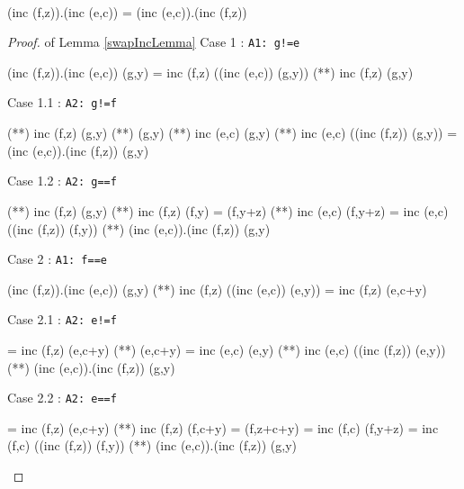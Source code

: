 \begin{lemma}\label{swapIncLemma}\ 
\begin{code}
(inc (f,z)).(inc (e,c)) = (inc (e,c)).(inc (f,z))
\end{code}
\end{lemma}
\begin{proof} of Lemma \ref{swapIncLemma}
Case 1 : \verb|A1: g!=e|
\begin{code}
(inc (f,z)).(inc (e,c)) (g,y) = inc (f,z) ((inc (e,c)) (g,y))
                              (**) inc (f,z) (g,y)
\end{code}
Case 1.1 : \verb|A2: g!=f|
\begin{code}
                              (**) inc (f,z) (g,y)
                              (**) (g,y)
                              (**) inc (e,c) (g,y)
                              (*\sEq{A2}*) inc (e,c) ((inc (f,z)) (g,y))
                              = (inc (e,c)).(inc (f,z)) (g,y)
\end{code}
Case 1.2 : \verb|A2: g==f|
\begin{code}
                              (**) inc (f,z) (g,y)
                              (**) inc (f,z) (f,y)
                              = (f,y+z)
                              (**) inc (e,c) (f,y+z)
                              = inc (e,c) ((inc (f,z)) (f,y))
                              (**) (inc (e,c)).(inc (f,z)) (g,y)
\end{code}
Case 2 : \verb|A1: f==e|
\begin{code}
(inc (f,z)).(inc (e,c)) (g,y) (**) inc (f,z) ((inc (e,c)) (e,y))
                              = inc (f,z) (e,c+y)
\end{code}
Case 2.1 : \verb|A2: e!=f|
\begin{code}
                              = inc (f,z) (e,c+y)
                              (**) (e,c+y)
                              = inc (e,c) (e,y)
                              (**) inc (e,c) ((inc (f,z)) (e,y))
                              (*\sEq{A1}*) (inc (e,c)).(inc (f,z)) (g,y)
\end{code}
Case 2.2 : \verb|A2: e==f|
\begin{code}
                              = inc (f,z) (e,c+y)
                              (**) inc (f,z) (f,c+y)
                              = (f,z+c+y)
                              = inc (f,c) (f,y+z)
                              = inc (f,c) ((inc (f,z)) (f,y))
                              (**) (inc (e,c)).(inc (f,z)) (g,y)
\end{code}
\end{proof}

